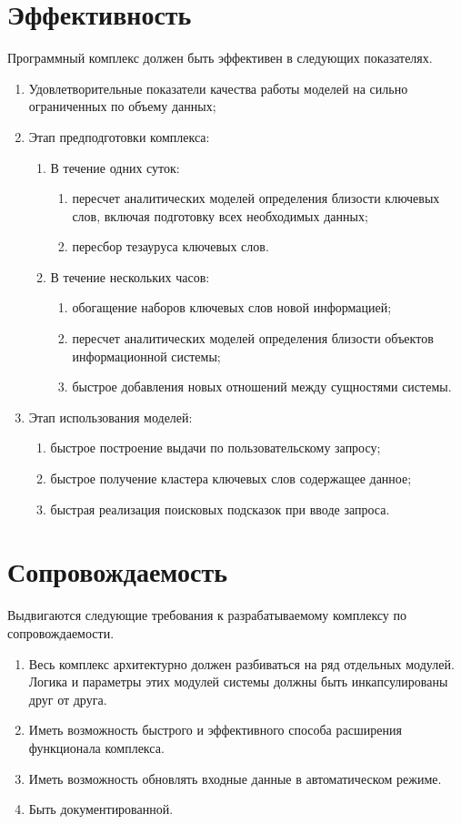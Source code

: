 \section{Эффективность}
Программный комплекс должен быть эффективен в следующих показателях.
\begin{enumerate}
    \item Удовлетворительные показатели качества работы моделей на сильно ограниченных по объему данных;
    \item Этап предподготовки комплекса:
        \begin{enumerate}
            \item В течение одних суток:
            \begin{enumerate}
                \item пересчет аналитических моделей определения близости ключевых слов, включая подготовку всех необходимых данных;
                \item пересбор тезауруса ключевых слов.
            \end{enumerate}
            \item В течение нескольких часов:
            \begin{enumerate}
                \item обогащение наборов ключевых слов новой информацией;
                \item пересчет аналитических моделей определения близости объектов информационной системы;
                \item быстрое добавления новых отношений между сущностями системы.
            \end{enumerate}
        \end{enumerate}
    \item  Этап использования моделей:
        \begin{enumerate}
            \item  быстрое построение выдачи по пользовательскому запросу;
            \item  быстрое получение кластера ключевых слов содержащее данное;
            \item  быстрая реализация поисковых подсказок при вводе запроса.
        \end{enumerate}
\end{enumerate}
\section{Сопровождаемость}
Выдвигаются следующие требования к разрабатываемому комплексу по сопровождаемости.
\begin{enumerate}
    \item  Весь комплекс архитектурно должен разбиваться на ряд отдельных модулей. Логика и параметры этих модулей системы должны быть инкапсулированы друг от друга.
    \item  Иметь возможность быстрого и эффективного способа расширения функционала комплекса.
    \item  Иметь возможность обновлять входные данные в автоматическом режиме.
    \item  Быть документированной.
\end{enumerate}
